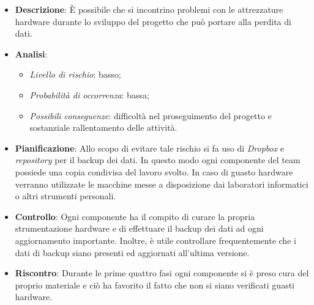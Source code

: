 			\begin{itemize}
				\item \textbf{Descrizione}: È possibile che si incontrino problemi con le attrezzature hardware durante lo sviluppo del progetto che può portare alla perdita di dati.
				\item \textbf{Analisi}:
				\begin{itemize}
					\item \textit{Livello di rischio}: basso;
					\item \textit{Probabilità di occorrenza}: bassa;
					\item \textit{Possibili conseguenze}: difficoltà nel proseguimento del progetto e sostanziale rallentamento delle attività.
				\end{itemize}
				\item \textbf{Pianificazione}: Allo scopo di evitare tale rischio si fa uso di \textit{Dropbox} e \textit{repository} per il backup dei dati. In questo modo ogni componente del team possiede una copia condivisa del lavoro svolto. In caso di guasto hardware verranno utilizzate le macchine messe a disposizione dai laboratori informatici o altri strumenti personali.
				\item \textbf{Controllo}: Ogni componente ha il compito di curare la propria strumentazione hardware e di effettuare il backup dei dati ad ogni aggiornamento importante. Inoltre, è utile controllare frequentemente che i dati di backup siano presenti ed aggiornati all'ultima versione.
				\item \textbf{Riscontro}: Durante le prime quattro fasi ogni componente si è preso cura del proprio materiale e ciò ha favorito il fatto che non si siano verificati guasti hardware.
			\end{itemize}
